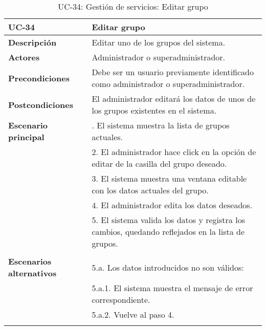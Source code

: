 \begin{table}[H]
  \begin{center}
    \begin{tabularx}{16.4cm}{|l|X|}
      \hline
      \textbf{UC-34} & \textbf{Editar grupo}\\
      \hline
      \textbf{Descripción} & Editar uno de los grupos del sistema.\\
      \hline
      \textbf{Actores} & Administrador o superadministrador.\\
      \hline
      \textbf{Precondiciones} & Debe ser un usuario previamente identificado como administrador o superadministrador.\\
      \hline
      \textbf{Postcondiciones} & El administrador editará los datos de unos de los grupos existentes en el sistema.\\
      \hline
      \textbf{Escenario principal} & \smallskip 1. El sistema muestra la lista de grupos actuales.\\
      & 2. El administrador hace click en la opción de editar de la casilla del grupo deseado.\\
      & 3. El sistema muestra una ventana editable con los datos actuales del grupo.\\
      & 4. El administrador edita los datos deseados.\\
      & 5. El sistema valida los datos y registra los cambios, quedando reflejados en la lista de grupos.\\
      & \\
      \hline
      \textbf{Escenarios alternativos} & \smallskip 5.a. Los datos introducidos no son válidos:\\
      & \hspace{0.3cm} 5.a.1. El sistema muestra el mensaje de error correspondiente.\\
      & \hspace{0.3cm} 5.a.2. Vuelve al paso 4.\\
      & \\
      \hline
    \end{tabularx}
    \caption{UC-34: Gestión de servicios: Editar grupo}
  \end{center}
\end{table}


